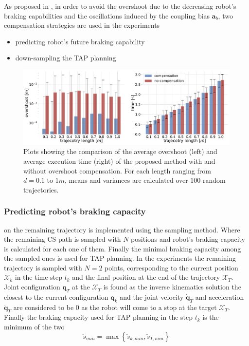 As proposed in , in order to avoid the overshoot due to the decreasing robot's braking capabilities and the oscillations induced by the coupling bias $\bm{a}_b$, two compensation strategies are used in the experiments
\begin{itemize}
    \item predicting robot's future braking capability
    \item down-sampling the TAP planning  
\end{itemize}

\begin{figure}[!tb]
    \centering
    \includegraphics[width=\linewidth]{Papers/imgs/compensation_comp.pdf}
    \caption{Plots showing the comparison of the average overshoot (left) and average execution time (right) of the proposed method with and without overshoot compensation. For each length ranging from $d=0.1$ to $1m$, means and variances are calculated over 100 random trajectories. }
    \label{fig:compensatiopn_comp}
\end{figure}

\subsubsection{Predicting robot's braking capacity} on the remaining trajectory is implemented using the sampling method. Where the remaining CS path is sampled with $N$ positions and robot's braking capacity is calculated for each one of them. Finally the minimal braking capacity among the sampled ones is used for TAP planning. In the experiments the remaining trajectory is sampled with $N=2$ points, corresponding to the current position $\mathcal{X}_k$ in the time step $t_k$ and the final position at the end of the trajectory $\mathcal{X}_T$. Joint configuration $\bm{q}_T$ at the $\mathcal{X}_T$ is found as the inverse kinematics solution the closest to the current configuration $\bm{q}_k$ and the joint velocity $\dot{\bm{q}}_T$ and acceleration $\ddot{\bm{q}}_T$ are considered to be $0$ as the robot will come to a stop at the target $\mathcal{X}_T$. Finally the braking capacity used for TAP planning in the step $t_k$ is the minimum of the two
\begin{equation}
    \ddot{s}_{min} = \max\left\{\ddot{s}_{k,min}, \ddot{s}_{T,min}\right\}
\end{equation}

